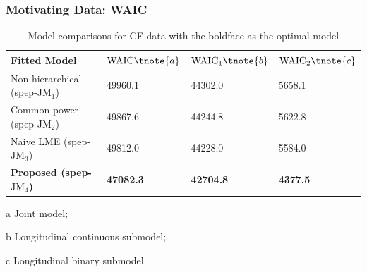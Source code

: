 \documentclass[fleqn]{beamer}
\begin{document}
\begin{frame}
\frametitle{Motivating Data: WAIC}
\footnotesize
\begin{table}[H]
 \caption{\scriptsize Model comparisons for CF data with the boldface as the optimal model}
   \begin{threeparttable}
  \begin{tabular}{llll}
    \toprule
 Fitted Model & $\mbox{WAIC} \tnote{a} $ & $\mbox{WAIC}_1 \tnote{b} $ & $\mbox{WAIC}_2 \tnote{c} $ \\
 \midrule 
   Non-hierarchical (spep-$\mbox{JM}_1$) & 49960.1 &	44302.0	& 5658.1\\
   Common power (spep-$\mbox{JM}_2$) & 49867.6 &	44244.8	& 5622.8\\
   Naive LME (spep-$\mbox{JM}_3$)  & 49812.0 & 44228.0 & 5584.0\\
   \bf Proposed (spep-$\mbox{JM}_4$) & \bf 47082.3 & \bf 42704.8 & \bf 4377.5\\
    \bottomrule
  \end{tabular}
   \begin{tablenotes}[para]
    \tiny
    \item[a] Joint model; \item[b] Longitudinal continuous submodel; \item[c] Longitudinal binary submodel
    \end{tablenotes}
     \end{threeparttable}
\end{table}
\end{frame}
\end{document}
